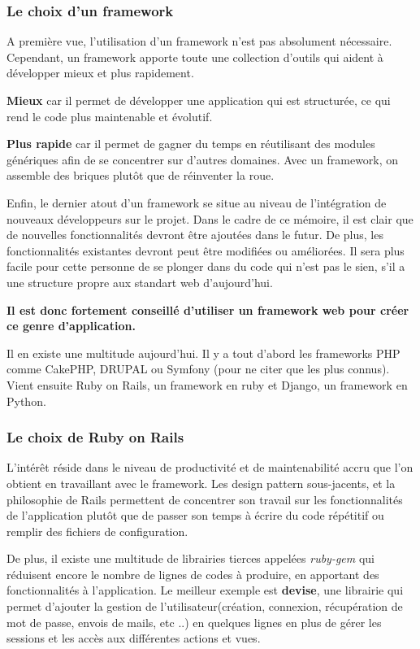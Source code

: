 \subsubsection{Le choix d'un framework}
A première vue, l'utilisation d'un framework n'est pas absolument nécessaire. Cependant, un framework apporte toute une collection d'outils qui aident à développer mieux et plus rapidement.

\textbf{Mieux} car il permet de développer une application qui est structurée, ce qui rend le code plus maintenable et évolutif.

\textbf{Plus rapide} car il permet de gagner du temps en réutilisant des modules génériques afin de se concentrer sur d'autres domaines. Avec un framework, on assemble des briques plutôt que de réinventer la roue. 

Enfin, le dernier atout d'un framework se situe au niveau de l'intégration de nouveaux développeurs sur le projet. Dans le cadre de ce mémoire, il est clair que de nouvelles fonctionnalités devront être ajoutées dans le futur. De plus, les fonctionnalités existantes devront peut être modifiées ou améliorées. Il sera plus facile pour cette personne de se plonger dans du code qui n'est pas le sien, s'il a une structure propre aux standart web d'aujourd'hui.

\textbf{Il est donc fortement conseillé d'utiliser un framework web pour créer ce genre d'application.} 

Il en existe une multitude aujourd'hui. Il y a tout d'abord les frameworks PHP comme CakePHP, DRUPAL ou Symfony (pour ne citer que les plus connus). Vient ensuite Ruby on Rails, un framework en ruby et Django, un framework en Python.  
\subsubsection{Le choix de Ruby on Rails}
L'intérêt réside dans le niveau de productivité et de maintenabilité accru que l'on obtient en travaillant avec le framework. Les design pattern sous-jacents, et la philosophie de Rails permettent de concentrer son travail sur les fonctionnalités de l'application plutôt que de passer son temps à écrire du code répétitif ou remplir des fichiers de configuration. 

De plus, il existe une multitude de librairies tierces appelées \textit{ruby-gem} qui réduisent encore le nombre de lignes de codes à produire, en apportant des fonctionnalités à l'application. Le meilleur exemple est \textbf{devise}, une librairie qui permet d'ajouter la gestion de l'utilisateur(création, connexion, récupération de mot de passe, envois de mails, etc ..) en quelques lignes en plus de gérer les sessions et les accès aux différentes actions et vues. 


